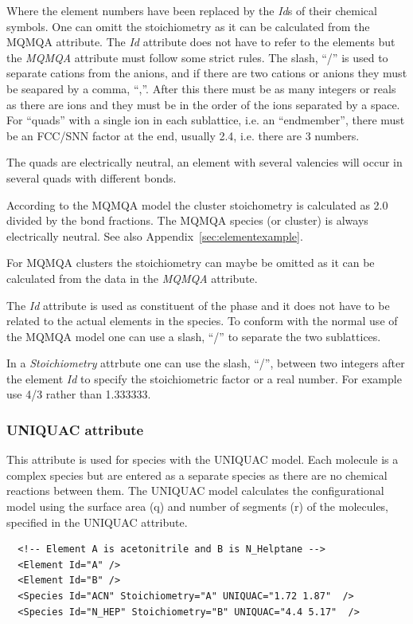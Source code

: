 \documentclass{article}
\begin{document}
Where the element numbers have been replaced by the {\em Id}s of their
chemical symbols.  One can omitt the stoichiometry as it can be
calculated from the MQMQA attribute.  The {\em Id} attribute does not
have to refer to the elements but the {\em MQMQA} attribute must
follow some strict rules.  The slash, ``/'' is used to separate
cations from the anions, and if there are two cations or anions they
must be seapared by a comma, ``,''.  After this there must be as many
integers or reals as there are ions and they must be in the order of
the ions separated by a space.  For ``quads'' with a single ion in
each sublattice, i.e. an ``endmember'', there must be an FCC/SNN
factor at the end, usually 2.4, i.e. there are 3 numbers.

The quads are electrically neutral, an element with several valencies
will occur in several quads with different bonds.

According to the MQMQA model the cluster stoichometry is calculated as
2.0 divided by the bond fractions.  The MQMQA species (or cluster) is
always electrically neutral.  See also
Appendix~\ref{sec:elementexample}.

For MQMQA clusters the stoichiometry can maybe be omitted as it can be
calculated from the data in the {\em MQMQA} attribute.

The {\em Id} attribute is used as constituent of the phase and it does
not have to be related to the actual elements in the species.  To
conform with the normal use of the MQMQA model one can use a slash,
``/'' to separate the two sublattices.

In a {\em Stoichiometry} attrbute one can use the slash, ``/'',
between two integers after the element {\em Id} to specify the
stoichiometric factor or a real number.  For example use 4/3 rather
than 1.333333.

\subsubsection{UNIQUAC attribute}\label{sec:uniquac}

This attribute is used for species with the UNIQUAC model.  Each
molecule is a complex species but are entered as a separate species as
there are no chemical reactions between them.  The UNIQUAC model
calculates the configurational model using the surface area (q) and
number of segments (r) of the molecules, specified in the UNIQUAC
attribute.

\begin{framed}
\begin{minipage}[t]{\textwidth}
\vspace{-2mm}
\noindent
{\small
\begin{verbatim}
  <!-- Element A is acetonitrile and B is N_Helptane -->
  <Element Id="A" />
  <Element Id="B" />
  <Species Id="ACN" Stoichiometry="A" UNIQUAC="1.72 1.87"  />
  <Species Id="N_HEP" Stoichiometry="B" UNIQUAC="4.4 5.17"  />
\end{verbatim}
}
\end{minipage}
\end{framed}
\end{document}
